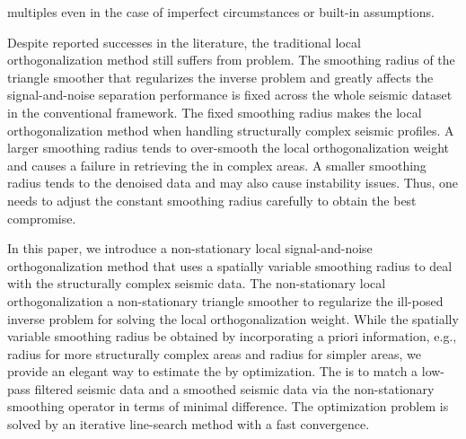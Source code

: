 multiples even in the case of imperfect circumstances or built-in assumptions. 

Despite  reported successes in the literature, the traditional local orthogonalization method still suffers from  problem. The smoothing radius of the triangle smoother that regularizes the inverse problem and greatly affects the signal-and-noise separation performance is fixed across the whole seismic dataset in the conventional framework. The fixed smoothing radius makes the local orthogonalization method when handling structurally complex seismic profiles. A larger smoothing radius tends to over-smooth the local orthogonalization weight and causes a failure in retrieving the  in complex areas. A smaller smoothing radius tends to  the denoised data and may also cause instability issues. Thus, one needs to adjust the  constant smoothing radius carefully to obtain the best compromise. 

In this paper, we introduce a non-stationary local signal-and-noise orthogonalization method that uses a spatially variable smoothing radius to deal with the structurally complex seismic data. The non-stationary local orthogonalization  a non-stationary triangle smoother to regularize the ill-posed inverse problem for solving the local orthogonalization weight. While the spatially variable smoothing radius  be obtained by incorporating  a priori information, e.g.,  radius for more structurally complex areas and  radius for simpler areas, we provide an elegant way to estimate the  by optimization. The  is to match a low-pass filtered seismic data and a smoothed seismic data via the non-stationary smoothing operator in terms of minimal  difference. The optimization problem is solved by an iterative line-search method with a fast convergence. 

